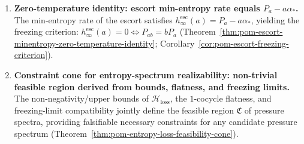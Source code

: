 \begin{enumerate}
  \item \textbf{Zero-temperature identity: escort min-entropy rate equals \texorpdfstring{$P_a-a\alpha_\ast$}{Pa-a alpha*}.}
  The min-entropy rate of the escort satisfies \(h_\infty^{\mathrm{esc}}(a)=P_a-a\alpha_\ast\), yielding the freezing criterion: \(h_\infty^{\mathrm{esc}}(a)=0\Longleftrightarrow P_{ab}=bP_a\) (Theorem~\ref{thm:pom-escort-minentropy-zero-temperature-identity}; Corollary~\ref{cor:pom-escort-freezing-criterion}).

  \item \textbf{Constraint cone for entropy-spectrum realizability: non-trivial feasible region derived from bounds, flatness, and freezing limits.}
  The non-negativity/upper bounds of \(\mathcal{H}_{\mathrm{loss}}\), the \(1\)-cocycle flatness, and freezing-limit compatibility jointly define the feasible region \(\mathfrak{C}\) of pressure spectra, providing falsifiable necessary constraints for any candidate pressure spectrum (Theorem~\ref{thm:pom-entropy-loss-feasibility-cone}).
\end{enumerate}

